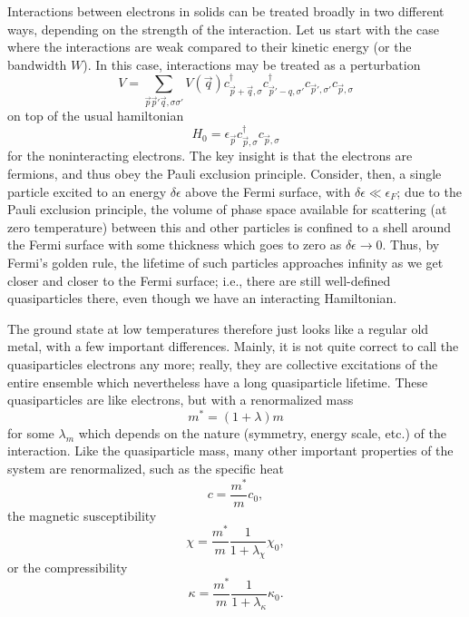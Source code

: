 Interactions between electrons in solids can be treated broadly in two different ways, depending on the strength of the interaction.
Let us start with the case where the interactions are weak compared to their kinetic energy (or the bandwidth $W$).
In this case, interactions may be treated as a perturbation
\begin{equation}
V = \sum_{\vec{p}\vec{p}'\vec{q},\sigma\sigma'}V(\vec{q})c^\dagger_{\vec{p}+\vec{q},\sigma}c^\dagger_{\vec{p}'-q,\sigma'}c_{\vec{p}',\sigma'}c_{\vec{p},\sigma}
\end{equation}
on top of the usual hamiltonian
\begin{equation}
H_0 = \epsilon_{\vec{p}} c^\dagger_{\vec{p},\sigma}c_{\vec{p},\sigma}
\end{equation}
for the noninteracting electrons.
The key insight is that the electrons are fermions, and thus obey the Pauli exclusion principle.
Consider, then, a single particle excited to an energy $\delta\epsilon$ above the Fermi surface, with $\delta\epsilon \ll \epsilon_F$; due to the Pauli exclusion principle, the volume of phase space available for scattering (at zero temperature) between this and other particles is confined to a shell around the Fermi surface with some thickness which goes to zero as $\delta\epsilon\rightarrow 0$.
Thus, by Fermi's golden rule, the lifetime of such particles approaches infinity as we get closer and closer to the Fermi surface; i.e., there are still well-defined quasiparticles there, even though we have an interacting Hamiltonian.

The ground state at low temperatures therefore just looks like a regular old metal, with a few important differences.
Mainly, it is not quite correct to call the quasiparticles electrons any more; really, they are collective excitations of the entire ensemble which nevertheless have a long quasiparticle lifetime.
These quasiparticles are like electrons, but with a renormalized mass
\begin{equation}
m^*=(1+\lambda)m
\end{equation}
for some $\lambda_m$ which depends on the nature (symmetry, energy scale, etc.) of the interaction.
Like the quasiparticle mass, many other important properties of the system are renormalized, such as the specific heat
\begin{equation}
c=\frac{m^*}{m}c_0,
\end{equation}
the magnetic susceptibility
\begin{equation}
\chi=\frac{m^*}{m}\frac{1}{1+\lambda_\chi}{\chi_0},
\end{equation}
or the compressibility
\begin{equation}
\kappa=\frac{m^*}{m}\frac{1}{1+\lambda_\kappa}{\kappa_0}.
\end{equation}
